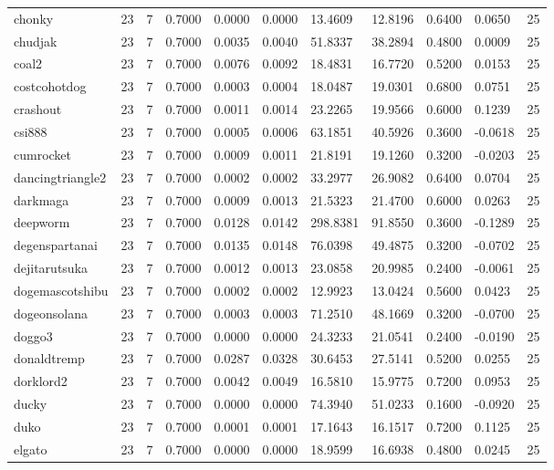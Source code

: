 \begin{table}[htbp]
\begin{tabular}{lllllllllll}
chonky & 23 & 7 & 0.7000 & 0.0000 & 0.0000 & 13.4609 & 12.8196 & 0.6400 & 0.0650 & 25 \\
chudjak & 23 & 7 & 0.7000 & 0.0035 & 0.0040 & 51.8337 & 38.2894 & 0.4800 & 0.0009 & 25 \\
coal2 & 23 & 7 & 0.7000 & 0.0076 & 0.0092 & 18.4831 & 16.7720 & 0.5200 & 0.0153 & 25 \\
costcohotdog & 23 & 7 & 0.7000 & 0.0003 & 0.0004 & 18.0487 & 19.0301 & 0.6800 & 0.0751 & 25 \\
crashout & 23 & 7 & 0.7000 & 0.0011 & 0.0014 & 23.2265 & 19.9566 & 0.6000 & 0.1239 & 25 \\
csi888 & 23 & 7 & 0.7000 & 0.0005 & 0.0006 & 63.1851 & 40.5926 & 0.3600 & -0.0618 & 25 \\
cumrocket & 23 & 7 & 0.7000 & 0.0009 & 0.0011 & 21.8191 & 19.1260 & 0.3200 & -0.0203 & 25 \\
dancingtriangle2 & 23 & 7 & 0.7000 & 0.0002 & 0.0002 & 33.2977 & 26.9082 & 0.6400 & 0.0704 & 25 \\
darkmaga & 23 & 7 & 0.7000 & 0.0009 & 0.0013 & 21.5323 & 21.4700 & 0.6000 & 0.0263 & 25 \\
deepworm & 23 & 7 & 0.7000 & 0.0128 & 0.0142 & 298.8381 & 91.8550 & 0.3600 & -0.1289 & 25 \\
degenspartanai & 23 & 7 & 0.7000 & 0.0135 & 0.0148 & 76.0398 & 49.4875 & 0.3200 & -0.0702 & 25 \\
dejitarutsuka & 23 & 7 & 0.7000 & 0.0012 & 0.0013 & 23.0858 & 20.9985 & 0.2400 & -0.0061 & 25 \\
dogemascotshibu & 23 & 7 & 0.7000 & 0.0002 & 0.0002 & 12.9923 & 13.0424 & 0.5600 & 0.0423 & 25 \\
dogeonsolana & 23 & 7 & 0.7000 & 0.0003 & 0.0003 & 71.2510 & 48.1669 & 0.3200 & -0.0700 & 25 \\
doggo3 & 23 & 7 & 0.7000 & 0.0000 & 0.0000 & 24.3233 & 21.0541 & 0.2400 & -0.0190 & 25 \\
donaldtremp & 23 & 7 & 0.7000 & 0.0287 & 0.0328 & 30.6453 & 27.5141 & 0.5200 & 0.0255 & 25 \\
dorklord2 & 23 & 7 & 0.7000 & 0.0042 & 0.0049 & 16.5810 & 15.9775 & 0.7200 & 0.0953 & 25 \\
ducky & 23 & 7 & 0.7000 & 0.0000 & 0.0000 & 74.3940 & 51.0233 & 0.1600 & -0.0920 & 25 \\
duko & 23 & 7 & 0.7000 & 0.0001 & 0.0001 & 17.1643 & 16.1517 & 0.7200 & 0.1125 & 25 \\
elgato & 23 & 7 & 0.7000 & 0.0000 & 0.0000 & 18.9599 & 16.6938 & 0.4800 & 0.0245 & 25 \\

\end{tabular}
\end{table}

